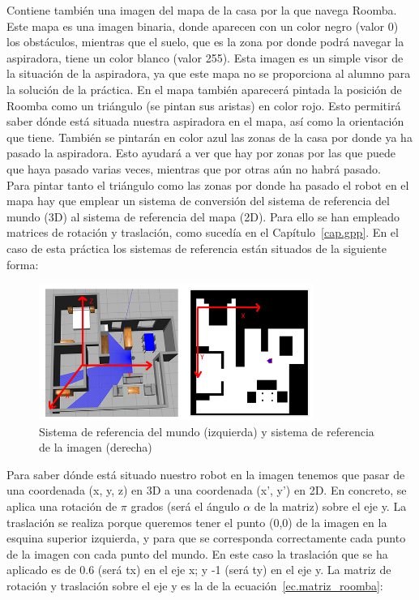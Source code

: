 Contiene también una imagen del mapa de la casa por la que navega Roomba. Este mapa es una imagen binaria, donde aparecen con un color negro (valor 0) los obstáculos, mientras que el suelo, que es la zona por donde podrá navegar la aspiradora, tiene un color blanco (valor 255). Esta imagen es un simple visor de la situación de la aspiradora, ya que este mapa no se proporciona al alumno para la solución de la práctica. En el mapa también aparecerá pintada la posición de Roomba como un triángulo (se pintan sus aristas) en color rojo. Esto permitirá saber dónde está situada nuestra aspiradora en el mapa, así como la orientación que tiene. También se pintarán en color azul las zonas de la casa por donde ya ha pasado la aspiradora. Esto ayudará a ver que hay por zonas por las que puede que haya pasado varias veces, mientras que por otras aún no habrá pasado.\\

Para pintar tanto el triángulo como las zonas por donde ha pasado el robot en el mapa hay que emplear un sistema de conversión del sistema de referencia del mundo (3D) al sistema de referencia del mapa (2D). Para ello se han empleado matrices de rotación y traslación, como sucedía en el Capítulo~\ref{cap.gpp}. En el caso de esta práctica los sistemas de referencia están situados de la siguiente forma:

\begin{figure}[H]
  \begin{center}
    \includegraphics[width=0.8\textwidth]{figures/Vacuum/SistemaRef_world_image.png}
		\caption{Sistema de referencia del mundo (izquierda) y sistema de referencia de la imagen (derecha)}
		\label{fig.sistemaref_world}
		\end{center}
\end{figure}

Para saber dónde está situado nuestro robot en la imagen tenemos que pasar de una coordenada (x, y, z) en 3D a una coordenada (x’, y’) en 2D. En concreto, se aplica una rotación de \(\pi\) grados (será el ángulo \(\alpha\) de la matriz) sobre el eje y. La traslación se realiza porque queremos tener el punto (0,0) de la imagen en la esquina superior izquierda, y para que se corresponda correctamente cada punto de la imagen con cada punto del mundo. En este caso la traslación que se ha aplicado es de 0.6 (será tx) en el eje x; y -1 (será ty) en el eje y. La matriz de rotación y traslación sobre el eje y es la de la ecuación~\ref{ec.matriz_roomba}:


